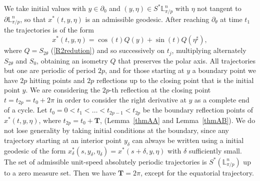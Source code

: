 \documentclass[11pt,a4paper,times]{amsart}
\theoremstyle{plain}
\theoremstyle{definition}
\numberwithin{equation}{section}
\newcommand{\lune}[2]{\mathbb{L}^{#1}_{#2}}
\begin{document}
{   We take initial values with $y\in \partial_0$ and $(y,\eta)\in S^*{\lune{n}{\pi/p}}$
  with  $\eta$  not tangent to $\partial \mathbb{L}^n_{\pi/p}$,  so  that $x^*(t, y, \eta)$ is an admissible geodesic.
After reaching $\partial_{\theta}$ at time $t_1$ the trajectories is of the  form
\begin{equation}\label{inicialB}
x^*(t,y,\eta)= \cos(t)Q(y)+ \sin(t) Q\left(\eta^{\sharp}\right), 
\end{equation}
 where $Q=S_{2\theta}$ (\ref{R2redution}) and so successively on $t_j$,  multiplying alternately $S_{2\theta}$ and  $S_0$, obtaining an isometry $Q$ that preserves the polar axis. All trajectories but one are periodic of period $2p$, and for those starting at $y$ a boundary point we have $2p$ hitting points and $2p$ reflections up to the closing point that is the initial point $y$. We are considering the $2p$-th reflection at the closing point $t=t_{2p}=t_0+2\pi$ in order to consider the right derivative at $y$ as a complete end of a cycle. Let $t_0=0<t_1<\ldots< t_{2p-1}<t_{2p}$ be the boundary reflection points of $x^*(t, y, \eta)$, where  $t_{2p}=t_{0}+\boldsymbol{T}$, (Lemma~\ref{thmAA} and Lemma~\ref{thmAB}). We do not lose generality by taking initial conditions at the boundary, since
 any trajectory starting at an interior point $y_{\delta}$ can always be written using a initial geodesic of the form  
 $x_{\delta}^*(s,y_{\delta},\eta_{\delta})=
 x^*(s+\delta, y, \eta)$ with $\delta$
 sufficiently small. 
The set of admissible unit-speed absolutely periodic trajectories is $S^*(\mathbb{L}^n_{\pi/p})$ up to a zero measure set. Then we have $\boldsymbol{T}=2\pi$, except for the equatorial trajectory.

}
\end{document}
